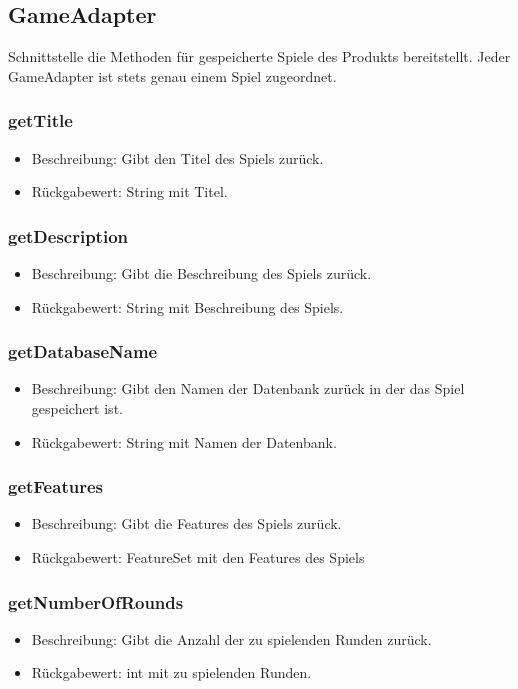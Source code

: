\documentclass[a4paper]{scrreprt}
\begin{document}
	\subsection{GameAdapter}
	Schnittstelle die Methoden für gespeicherte Spiele des Produkts bereitstellt.
	Jeder GameAdapter ist stets genau einem Spiel zugeordnet.

	\subsubsection{getTitle}
	\begin{itemize}
		\item Beschreibung: Gibt den Titel des Spiels zurück.
		\item Rückgabewert: String mit Titel.
	\end{itemize}

	\subsubsection{getDescription}
	\begin{itemize}
		\item Beschreibung: Gibt die Beschreibung des Spiels zurück.
		\item Rückgabewert: String mit Beschreibung des Spiels.
	\end{itemize}

	\subsubsection{getDatabaseName}
	\begin{itemize}
		\item Beschreibung: Gibt den Namen der Datenbank zurück in der das Spiel gespeichert ist.
		\item Rückgabewert: String mit Namen der Datenbank.
	\end{itemize}

	\subsubsection{getFeatures}
	\begin{itemize}
		\item Beschreibung: Gibt die Features des Spiels zurück.
		\item Rückgabewert: FeatureSet mit den Features des Spiels
	\end{itemize}

	\subsubsection{getNumberOfRounds}
	\begin{itemize}
		\item Beschreibung: Gibt die Anzahl der zu spielenden Runden zurück.
		\item Rückgabewert: int mit zu spielenden Runden.
	\end{itemize}
\end{document}
